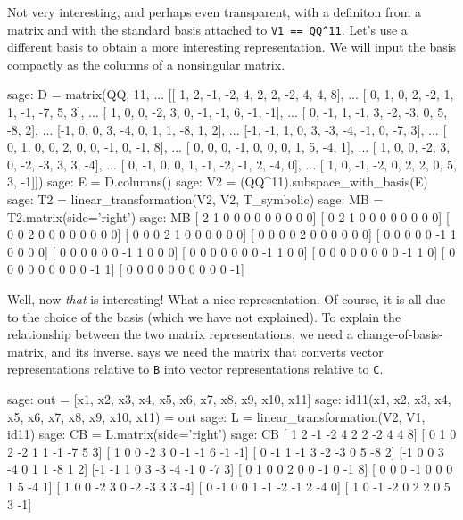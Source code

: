 %
Not very interesting, and perhaps even transparent, with a definiton from a matrix and with the standard basis attached to \verb?V1 == QQ^11?.  Let's use a different basis to obtain a more interesting representation.  We will input the basis compactly as the columns of a nonsingular matrix.
%
\begin{sageexample}
sage: D = matrix(QQ, 11,
...       [[ 1,  2, -1, -2,  4,  2,  2, -2,  4,  4,  8],
...        [ 0,  1,  0,  2, -2,  1,  1, -1, -7,  5,  3],
...        [ 1,  0,  0, -2,  3,  0, -1, -1,  6, -1, -1],
...        [ 0, -1,  1, -1,  3, -2, -3,  0,  5, -8,  2],
...        [-1,  0,  0,  3, -4,  0,  1,  1, -8,  1,  2],
...        [-1, -1,  1,  0,  3, -3, -4, -1,  0, -7,  3],
...        [ 0,  1,  0,  0,  2,  0,  0, -1,  0, -1,  8],
...        [ 0,  0,  0, -1,  0,  0,  0,  1,  5, -4,  1],
...        [ 1,  0,  0, -2,  3,  0, -2, -3,  3,  3, -4],
...        [ 0, -1,  0,  0,  1, -1, -2, -1,  2, -4,  0],
...        [ 1,  0, -1, -2,  0,  2,  2,  0,  5,  3, -1]])
sage: E = D.columns()
sage: V2 = (QQ^11).subspace_with_basis(E)
sage: T2 = linear_transformation(V2, V2, T_symbolic)
sage: MB = T2.matrix(side='right')
sage: MB
[ 2  1  0  0  0  0  0  0  0  0  0]
[ 0  2  1  0  0  0  0  0  0  0  0]
[ 0  0  2  0  0  0  0  0  0  0  0]
[ 0  0  0  2  1  0  0  0  0  0  0]
[ 0  0  0  0  2  0  0  0  0  0  0]
[ 0  0  0  0  0 -1  1  0  0  0  0]
[ 0  0  0  0  0  0 -1  1  0  0  0]
[ 0  0  0  0  0  0  0 -1  1  0  0]
[ 0  0  0  0  0  0  0  0 -1  1  0]
[ 0  0  0  0  0  0  0  0  0 -1  1]
[ 0  0  0  0  0  0  0  0  0  0 -1]
\end{sageexample}
%
Well, now \emph{that} is interesting!  What a nice representation.  Of course, it is all due to the choice of the basis (which we have not explained).  To explain the relationship between the two matrix representations, we need a change-of-basis-matrix, and its inverse.   says we need the matrix that converts vector representations relative to \verb?B? into vector representations relative to \verb?C?.
%
\begin{sageexample}
sage: out = [x1, x2, x3, x4, x5, x6, x7, x8, x9, x10, x11]
sage: id11(x1, x2, x3, x4, x5, x6, x7, x8, x9, x10, x11) = out
sage: L = linear_transformation(V2, V1, id11)
sage: CB = L.matrix(side='right')
sage: CB
[ 1  2 -1 -2  4  2  2 -2  4  4  8]
[ 0  1  0  2 -2  1  1 -1 -7  5  3]
[ 1  0  0 -2  3  0 -1 -1  6 -1 -1]
[ 0 -1  1 -1  3 -2 -3  0  5 -8  2]
[-1  0  0  3 -4  0  1  1 -8  1  2]
[-1 -1  1  0  3 -3 -4 -1  0 -7  3]
[ 0  1  0  0  2  0  0 -1  0 -1  8]
[ 0  0  0 -1  0  0  0  1  5 -4  1]
[ 1  0  0 -2  3  0 -2 -3  3  3 -4]
[ 0 -1  0  0  1 -1 -2 -1  2 -4  0]
[ 1  0 -1 -2  0  2  2  0  5  3 -1]
\end{sageexample}
